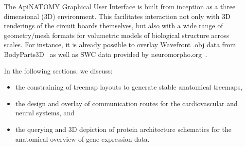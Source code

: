 The ApiNATOMY Graphical User Interface is built from inception as a three dimensional (3D) environment. This facilitates interaction not only with 3D renderings of the circuit boards themselves, but also with a wide range of geometry/mesh formats for volumetric models of biological structure across scales. For instance, it is already possible to overlay Wavefront .obj data from BodyParts3D~\cite{MFT+09} as well as SWC data provided by neuromorpho.org~\cite{Asc06}.

In the following sections, we discuss:
\begin{itemize}
  \item the constraining of treemap layouts to generate stable anatomical treemaps,
  \item the design and overlay of communication routes for the cardiovascular and neural systems, and
  \item the querying and 3D depiction of protein architecture schematics for the anatomical overview of gene expression data.
\end{itemize}

